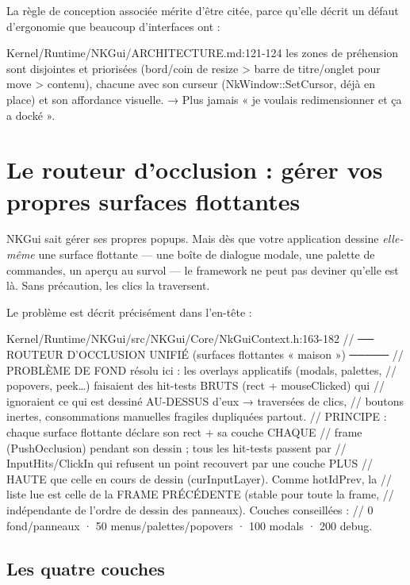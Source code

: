 La règle de conception associée mérite d'être citée, parce qu'elle décrit un
défaut d'ergonomie que beaucoup d'interfaces ont :

\begin{nkcode}{Kernel/Runtime/NKGui/ARCHITECTURE.md:121-124}
les zones de préhension sont disjointes et priorisées (bord/coin de resize >
barre de titre/onglet pour move > contenu), chacune avec son curseur
(NkWindow::SetCursor, déjà en place) et son affordance visuelle.
→ Plus jamais « je voulais redimensionner et ça a docké ».
\end{nkcode}

\section{Le routeur d'occlusion : gérer vos propres surfaces flottantes}

NKGui sait gérer ses propres popups. Mais dès que votre application dessine
\emph{elle-même} une surface flottante — une boîte de dialogue modale, une
palette de commandes, un aperçu au survol — le framework ne peut pas deviner
qu'elle est là. Sans précaution, les clics la traversent.

Le problème est décrit précisément dans l'en-tête :

\begin{nkcode}{Kernel/Runtime/NKGui/src/NKGui/Core/NkGuiContext.h:163-182}
// ── ROUTEUR D'OCCLUSION UNIFIÉ (surfaces flottantes « maison ») ─────
// PROBLÈME DE FOND résolu ici : les overlays applicatifs (modals, palettes,
// popovers, peek…) faisaient des hit-tests BRUTS (rect + mouseClicked) qui
// ignoraient ce qui est dessiné AU-DESSUS d'eux → traversées de clics,
// boutons inertes, consommations manuelles fragiles dupliquées partout.
// PRINCIPE : chaque surface flottante déclare son rect + sa couche CHAQUE
// frame (PushOcclusion) pendant son dessin ; tous les hit-tests passent par
// InputHits/ClickIn qui refusent un point recouvert par une couche PLUS
// HAUTE que celle en cours de dessin (curInputLayer). Comme hotIdPrev, la
// liste lue est celle de la FRAME PRÉCÉDENTE (stable pour toute la frame,
// indépendante de l'ordre de dessin des panneaux). Couches conseillées :
// 0 fond/panneaux · 50 menus/palettes/popovers · 100 modals · 200 debug.
\end{nkcode}

\subsection{Les quatre couches}

